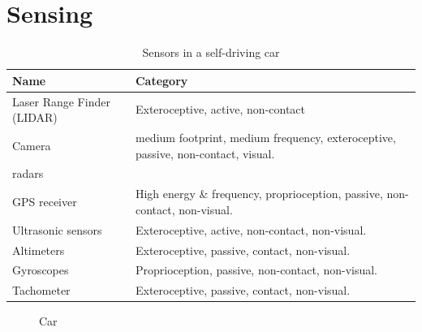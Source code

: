 \documentclass[acmsmall, screen,timestamp,nonacm]{acmart}
\begin{document}
\section{Sensing} %
\begin{table}[htpb]
	\centering
	\caption{Sensors in a self-driving car}
	\label{tab:sensor-car}
	\begin{minipage}{\columnwidth}
    \begin{tabularx}{\textwidth}{lX}
	\hline
		Name & Category\\
		\hline
		Laser Range Finder (LIDAR) & Exteroceptive, active, non-contact\\
		Camera & medium footprint, medium frequency, exteroceptive,
		passive, non-contact, visual.\\
	radars\\
		GPS receiver & High energy \& frequency, proprioception, passive,
		non-contact, non-visual.\\
		Ultrasonic sensors & Exteroceptive, active, non-contact,
		non-visual.\\
		Altimeters & Exteroceptive, passive, contact, non-visual.\\
		Gyroscopes & Proprioception, passive, non-contact, non-visual.\\
		Tachometer & Exteroceptive, passive, contact, non-visual.\\
	\hline
	\end{tabularx}
	\end{minipage}
\end{table}
		\begin{figure}
			\label{fig:bikes}
			\caption{Car}
			\centering
			
		\end{figure}
\end{document}
